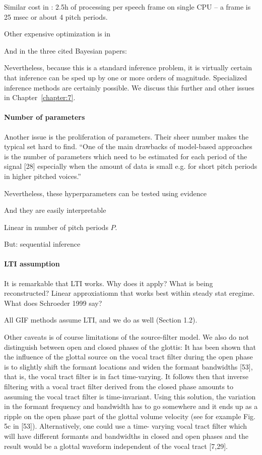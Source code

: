 \begin{chaptersections}
Similar cost in \citep{Auvinen2014}: 2.5h of processing per speech frame on single CPU -- a frame is 25 msec or about 4 pitch periods.

Other expensive optimization is in \citep{Airaksinen2017}

And in the three cited Bayesian papers: \cite{Wang2016a,Rao2018,Auvinen2014}

Nevertheless, because this is a standard inference problem, it is virtually certain that inference can be sped up by one or more orders of magnitude.
Specialized inference methods are certainly possible.
We discuss this further and other issues in Chapter~\ref{chapter:7}.

\paragraph{Number of parameters}

Another issue is the proliferation of parameters.
Their sheer number makes the typical set hard to find.
``One of the main
drawbacks of model-based approaches is the number of parameters which need
to be estimated for each period of the signal [28] especially when the amount of
data is small e.g. for short pitch periods in higher pitched voices.'' \citep{Walker2005}

Nevertheless, these hyperparameters can be tested using evidence

And they are easily interpretable

Linear in number of pitch periods $P$.

But: sequential inference

\paragraph{LTI assumption}
It is remarkable that LTI works.
Why does it apply?
What is being reconstructed?
Linear approxiatiomn that works best within steady stat eregime.
What does Schroeder 1999 say?

All GIF methods assume LTI, and we do as well (Section 1.2).

Other caveats is of course limitations of the source-filter model.
We also do not distinguish between open and closed phases of the glottis:
It has been shown that the inﬂuence of the glottal source on the vocal tract
ﬁlter during the open phase is to slightly shift the formant locations and widen
the formant bandwidths [53], that is, the vocal tract ﬁlter is in fact time-varying.
It follows then that inverse ﬁltering with a vocal tract filter derived from the
closed phase amounts to assuming the vocal tract ﬁlter is time-invariant. Using
this solution, the variation in the formant frequency and bandwidth has to go
somewhere and it ends up as a ripple on the open phase part of the glottal volume
velocity (see for example Fig. 5c in [53]). Alternatively, one could use a time-
varying vocal tract ﬁlter which will have different formants and bandwidths in
closed and open phases and the result would be a glottal waveform independent
of the vocal tract [7,29].
\citep{Walker2005}



\end{chaptersections}

